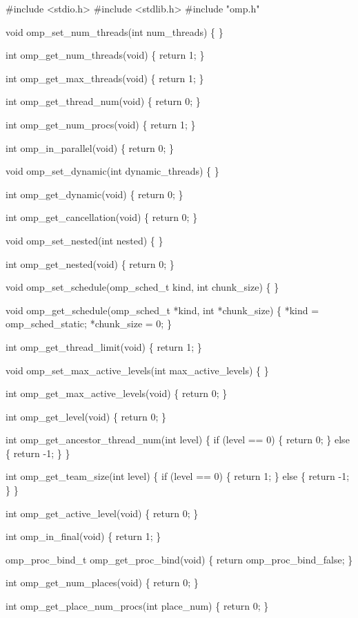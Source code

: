 {\small \begin{codepar}
\#include <stdio.h>
\#include <stdlib.h>
\#include "omp.h"

void omp\_set\_num\_threads(int num\_threads)
\{
\}

int omp\_get\_num\_threads(void)
\{
    return 1;
\}

int omp\_get\_max\_threads(void)
\{
    return 1;
\}

int omp\_get\_thread\_num(void)
\{
    return 0;
\}

int omp\_get\_num\_procs(void)
\{
    return 1;
\}

int omp\_in\_parallel(void)
\{
    return 0;
\}

void omp\_set\_dynamic(int dynamic\_threads)
\{
\}

int omp\_get\_dynamic(void)
\{
    return 0;
\}

int omp\_get\_cancellation(void)
\{
    return 0;
\}

void omp\_set\_nested(int nested)
\{
\}

int omp\_get\_nested(void)
\{
    return 0;
\}

void omp\_set\_schedule(omp\_sched\_t kind, int chunk\_size)
\{
\}

void omp\_get\_schedule(omp\_sched\_t *kind, int *chunk\_size)
\{
    *kind = omp\_sched\_static;
    *chunk\_size = 0;
\}

int omp\_get\_thread\_limit(void)
\{
    return 1;
\}

void omp\_set\_max\_active\_levels(int max\_active\_levels)
\{
\}

int omp\_get\_max\_active\_levels(void)
\{
    return 0;
\}

int omp\_get\_level(void)
\{
    return 0;
\}

int omp\_get\_ancestor\_thread\_num(int level)
\{
    if (level == 0)
    \{
        return 0;
    \}
    else
    \{
        return -1;
    \}
\}

int omp\_get\_team\_size(int level)
\{
    if (level == 0)
    \{
        return 1;
    \}
    else
    \{
        return -1;
    \}
\}

int omp\_get\_active\_level(void)
\{
    return 0;
\}

int omp\_in\_final(void)
\{
    return 1;
\}

omp\_proc\_bind\_t omp\_get\_proc\_bind(void) 
\{
    return omp\_proc\_bind\_false;
\}

int omp\_get\_num\_places(void)
\{
    return 0;
\}

int omp\_get\_place\_num\_procs(int place\_num)
\{
    return 0;
\}


\end{codepar}}
